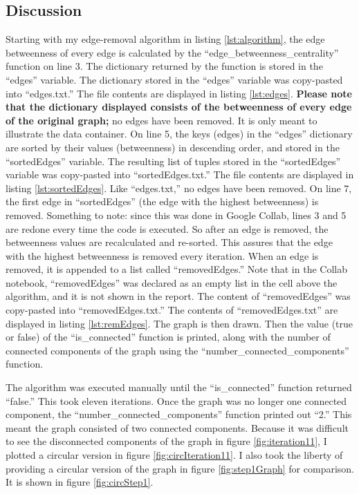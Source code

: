 \documentclass[12pt]{article}
\begin{document}
\pagebreak

\subsection*{Discussion}
Starting with my edge-removal algorithm in listing \ref{lst:algorithm}, the edge betweenness of every edge is calculated by the ``edge\_betweenness\_centrality'' function on line 3.  The dictionary returned by the function is stored in the ``edges'' variable.  The dictionary stored in the ``edges'' variable was copy-pasted into ``edges.txt.''  The file contents are displayed in listing \ref{lst:edges}.  \textbf{Please note that the dictionary displayed consists of the betweenness of every edge of the original graph;} no edges have been removed.  It is only meant to illustrate the data container.  On line 5, the keys (edges) in the ``edges'' dictionary are sorted by their values (betweenness) in descending order, and stored in the ``sortedEdges'' variable.  The resulting list of tuples stored in the ``sortedEdges'' variable was copy-pasted into ``sortedEdges.txt.''  The file contents are displayed in listing \ref{lst:sortedEdges}.  Like ``edges.txt,'' no edges have been removed.  On line 7, the first edge in ``sortedEdges'' (the edge with the highest betweenness) is removed.  Something to note: since this was done in Google Collab, lines 3 and 5 are redone every time the code is executed.  So after an edge is removed, the betweenness values are recalculated and re-sorted.  This assures that the edge with the highest betweenness is removed every iteration.  When an edge is removed, it is appended to a list called ``removedEdges.''  Note that in the Collab notebook,  ``removedEdges'' was declared as an empty list in the cell above the algorithm, and it is not shown in the report.  The content of ``removedEdges'' was copy-pasted into ``removedEdges.txt.''  The contents of ``removedEdges.txt'' are displayed in listing \ref{lst:remEdges}.  The graph is then drawn.  Then the value (true or false) of the ``is\_connected'' function is printed, along with the number of connected components of the graph using the ``number\_connected\_components'' function.

The algorithm was executed manually until the ``is\_connected'' function returned ``false.''  This took eleven iterations.  Once the graph was no longer one connected component, the ``number\_connected\_components'' function printed out ``2.''  This meant the graph consisted of two connected components.  Because it was difficult to see the disconnected components of the graph in figure \ref{fig:iteration11}, I plotted a circular version in figure \ref{fig:circIteration11}.  I also took the liberty of providing a circular version of the graph in figure \ref{fig:step1Graph} for comparison.  It is shown in figure \ref{fig:circStep1}.
\end{document}
